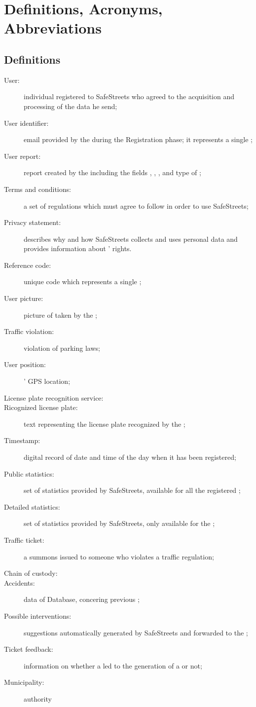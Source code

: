 \documentclass[../../rasd.tex]{subfiles}
\begin{document}
\section{Definitions, Acronyms, Abbreviations\label{sect:1.3}}

\subsection{Definitions\label{sect:1.3.1}}
\begin{description}
	\item[User:] individual registered to SafeStreets who agreed to the acquisition and processing of the data he send;
	\item[User identifier:] email provided by the  during the Registration phase; it represents a single ;
	\item[User report:] report created by the  including the fields , , ,  and type of ;
	\item[Terms and conditions:] a set of regulations which  must agree to follow	in order to use SafeStreets;
	\item[Privacy statement:] describes why and how SafeStreets collects and uses personal data and provides information about ' rights.
	\item[Reference code:] unique code which represents a single ;
	\item[User picture:] picture of  taken by the ;
	\item[Traffic violation:] violation of parking laws;
	\item[User position:] ' GPS location;
	\item[License plate recognition service:]
	\item[Ricognized license plate:] text representing the license plate recognized by the ;
	\item[Timestamp:] digital record of date and time of the day when it has been registered;
	\item[Public statistics:] set of  statistics provided by SafeStreets, available for all the registered ;
	\item[Detailed statistics:] set of  statistics provided by SafeStreets, only available for the ;
	\item[Traffic ticket:] a summons issued to someone who violates a traffic regulation;
	\item[Chain of custody:]
	\item[Accidents:] data of  Database, concering previous ;
	\item[Possible interventions:] suggestions automatically generated by SafeStreets and forwarded to the ;
	\item[Ticket feedback:] information on whether a  led to the generation of a  or not;
	\item[Municipality:] authority 
\end{description}
\end{document}
